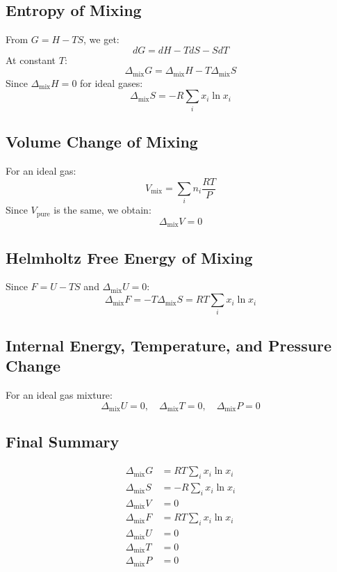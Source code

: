\documentclass{article}
\theoremstyle{definition}
\begin{document}
\subsection{Entropy of Mixing}
From $G = H - TS$, we get:
\begin{equation}
    dG = dH - TdS - SdT
\end{equation}
At constant $T$:
\begin{equation}
    \Delta_{\text{mix}} G = \Delta_{\text{mix}} H - T \Delta_{\text{mix}} S
\end{equation}
Since $\Delta_{\text{mix}} H = 0$ for ideal gases:
\begin{equation}
    \Delta_{\text{mix}} S = - R \sum_{i} x_i \ln x_i
\end{equation}

\subsection{Volume Change of Mixing}
For an ideal gas:
\begin{equation}
    V_{\text{mix}} = \sum_{i} n_i \frac{RT}{P}
\end{equation}
Since $V_{\text{pure}}$ is the same, we obtain:
\begin{equation}
    \Delta_{\text{mix}} V = 0
\end{equation}

\subsection{Helmholtz Free Energy of Mixing}
Since $F = U - TS$ and $\Delta_{\text{mix}} U = 0$:
\begin{equation}
    \Delta_{\text{mix}} F = - T \Delta_{\text{mix}} S = RT \sum_{i} x_i \ln x_i
\end{equation}

\subsection{Internal Energy, Temperature, and Pressure Change}
For an ideal gas mixture:
\begin{equation}
    \Delta_{\text{mix}} U = 0, \quad \Delta_{\text{mix}} T = 0, \quad \Delta_{\text{mix}} P = 0
\end{equation}

\subsection{Final Summary}
\begin{align}
    \Delta_{\text{mix}} G &= RT \sum_{i} x_i \ln x_i \\
    \Delta_{\text{mix}} S &= - R \sum_{i} x_i \ln x_i \\
    \Delta_{\text{mix}} V &= 0 \\
    \Delta_{\text{mix}} F &= RT \sum_{i} x_i \ln x_i \\
    \Delta_{\text{mix}} U &= 0 \\
    \Delta_{\text{mix}} T &= 0 \\
    \Delta_{\text{mix}} P &= 0
\end{align}
\end{document}
